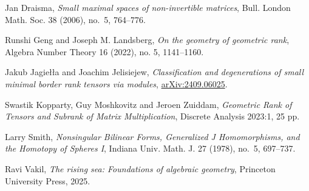 \documentclass[a4paper,10pt]{article}
\theoremstyle{definition}
\theoremstyle{remark}
\begin{document}
\def\arxiv#1{\href{https://arxiv.org/abs/#1}{arXiv:#1}}
\begin{thebibliography}{KMZ}
    Jan Draisma,
    \textit{Small maximal spaces of non-invertible matrices},
    Bull. London Math. Soc. 38 (2006), no.~5,
    764--776.

    Runshi Geng and Joseph M. Landsberg,
    \textit{On the geometry of geometric rank},
    Algebra Number Theory 16 (2022), no. 5, 1141–1160.



    Jakub Jagiełła and Joachim Jelisiejew,
    \textit{Classification and degenerations of small minimal border rank tensors via modules},
    \arxiv{2409.06025}.

    Swastik Kopparty, Guy Moshkovitz and Jeroen Zuiddam,
    \textit{Geometric Rank of Tensors and Subrank of Matrix Multiplication},
    Discrete Analysis 2023:1, 25 pp.

    Larry Smith,
    \emph{Nonsingular Bilinear Forms, Generalized J Homomorphisms, and the Homotopy of
Spheres I},
    Indiana Univ. Math. J. 27 (1978), no.~5, 697--737.

    Ravi Vakil,
    \emph{The rising sea: Foundations of algebraic geometry},
    Princeton University Press, 2025.

\end{thebibliography}
\end{document}

